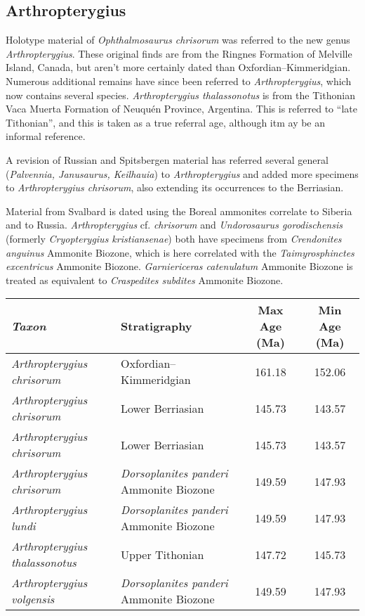 \documentclass[british]{article}
\begin{document}
\subsection{Arthropterygius}%
\label{sub:arthropterygius}

Holotype material of \emph{Ophthalmosaurus chrisorum} was referred to the new
genus \emph{Arthropterygius}.\autocite{Russell1993BGSC,Maxwell2010JVP} These
original finds are from the Ringnes Formation of Melville Island, Canada, but
aren’t more certainly dated than Oxfordian–Kimmeridgian. Numerous additional
remains have since been referred to \emph{Arthropterygius}, which now contains
several species. \emph{Arthropterygius thalassonotus} is from the Tithonian Vaca
Muerta Formation of Neuquén Province, Argentina. This is referred to “late
Tithonian”\autocite[5]{Campos2019ZJLS}, and this is taken as a true referral
age, although itm ay be an informal reference.

A revision of Russian and Spitsbergen material has referred several general
(\emph{Palvennia, Janusaurus, Keilhauia}) to \emph{Arthropterygius} and added
more specimens to \emph{Arthropterygius chrisorum}, also extending its
occurrences to the Berriasian.\autocite{Zverkov2019P}

Material from Svalbard is dated using the Boreal ammonites correlate to Siberia
and to Russia. \emph{Arthropterygius} cf. \emph{chrisorum} and
\emph{Undorosaurus gorodischensis} (formerly \emph{Cryopterygius kristiansenae})
both have specimens from \emph{Crendonites anguinus}  Ammonite
Biozone,\autocite{Zverkov2019JSP,Zverkov2019P} which is
here correlated with the \emph{Taimyrosphinctes excentricus} Ammonite Biozone.
\emph{Garniericeras catenulatum} Ammonite Biozone is treated as equivalent to
\emph{Craspedites subdites} Ammonite Biozone.

\begin{table}[htb]
    \footnotesize
    \begin{tabu}{>{\em}lXSS}
        \toprule
        Taxon                 & Stratigraphy & {Max Age (Ma)} & {Min Age (Ma)} \\
        \midrule
        Arthropterygius chrisorum & Oxfordian–Kimmeridgian & 161.18 & 152.06 \\
        Arthropterygius chrisorum & Lower Berriasian & 145.73 & 143.57 \\
        Arthropterygius chrisorum & Lower Berriasian & 145.73 & 143.57 \\
        Arthropterygius chrisorum & \emph{Dorsoplanites panderi} Ammonite Biozone & 149.59 & 147.93 \\
        Arthropterygius lundi & \emph{Dorsoplanites panderi} Ammonite Biozone & 149.59 & 147.93 \\
        Arthropterygius thalassonotus & Upper Tithonian & 147.72 & 145.73 \\
        Arthropterygius volgensis & \emph{Dorsoplanites panderi} Ammonite Biozone & 149.59 & 147.93 \\
        \bottomrule
    \end{tabu}
\end{table}
\end{document}

